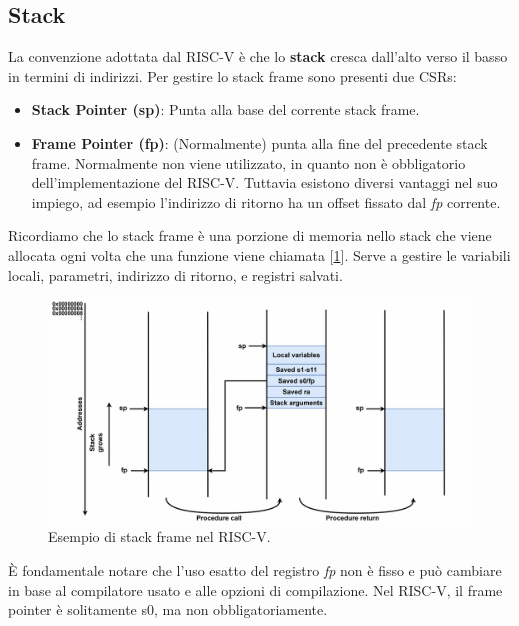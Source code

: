 \subsection{Stack}
La convenzione adottata dal RISC-V è che lo \textbf{stack} cresca dall'alto verso il basso in termini di indirizzi. Per gestire lo stack frame sono presenti due CSRs:
\begin{itemize}
	\item \textbf{Stack Pointer (sp)}: Punta alla base del corrente stack frame.
	\item \textbf{Frame Pointer (fp)}: (Normalmente) punta alla fine del precedente stack frame. Normalmente non viene utilizzato, in quanto non è obbligatorio dell'implementazione del RISC-V. Tuttavia esistono diversi vantaggi nel suo impiego, ad esempio l'indirizzo di ritorno ha un offset fissato dal \textit{fp} corrente.
\end{itemize}
Ricordiamo che lo stack frame è una porzione di memoria nello stack che viene allocata ogni volta che una funzione viene chiamata [\ref{fig:stack-frame}]. Serve a gestire le variabili locali, parametri, indirizzo di ritorno, e registri salvati.
\begin{figure}[!h]
	\centering
	\includegraphics[width=0.6\linewidth]{img/stack-frame}
	\caption{Esempio di stack frame nel RISC-V.}
	\label{fig:stack-frame}
\end{figure}
\MakeUppercase{è} fondamentale notare che l'uso esatto del registro \textit{fp} non è fisso e può cambiare in base al compilatore usato e alle opzioni di compilazione. Nel RISC-V, il frame pointer è solitamente s0, ma non obbligatoriamente.

